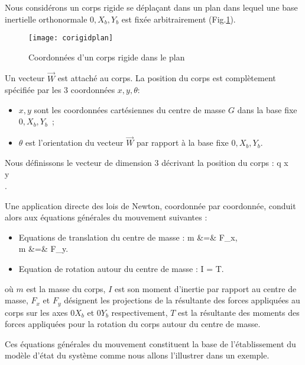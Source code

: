 Nous considérons un corps rigide se déplaçant dans un plan dans lequel une
base inertielle orthonormale $0, X_b, Y_b$ est fixée arbitrairement 
(Fig.\ref{Fig:corigidplan}).
\begin{figure}[h]
\begin{center}
\texttt{[image: corigidplan]}
\caption{Coordonnées d'un corps rigide dans le plan}
\label{Fig:corigidplan}
\end{center}
\end{figure}
Un vecteur $\vec{W}$ est attaché au corps. La position
du corps est complètement spécifiée par les 3 coordonnées $x, y, \theta$: 
\begin{itemize}
\item $x, y$ sont les coordonnées cartésiennes du centre de masse $G$ dans la base
fixe $0,X_b,Y_b$~;
\item $\theta$ est l'orientation du vecteur $\vec{W}$ par rapport à la base fixe $0,X_b,Y_b$. 
\end{itemize}
Nous définissons le vecteur de dimension 3 décrivant la position du corps :
\eqn
q \triangleq {} x \\y \\ \theta \ema. \label{cogen}
\eeqn

\noindent Une application directe des lois de Newton, coordonnée 
par coordonnée, conduit alors aux équations générales du mouvement suivantes :

\begin{itemize}
\item Equations de translation du centre de masse :
\eqnn
m &=& F_x, \\ m &=& F_y.
\eeqnn
\item Equation de rotation autour du centre de masse :
\eqnn
I\ddot{\theta} = T.
\eeqnn
\end{itemize}

\noindent où $m$ est la masse du corps, $I$ est son moment d'inertie par rapport au centre
de masse,
$F_x$ et 
$F_y$ désignent les projections de la résultante des forces appliquées au corps sur 
les axes $0X_b$ et $0Y_b$ 
respectivement, $T$ est la résultante des moments des forces appliquées
pour la rotation du corps autour du centre de masse.

Ces équations générales du mouvement constituent la base de l'éta\-blis\-sement 
du modèle d'état du système comme nous allons l'illustrer dans un exemple.

